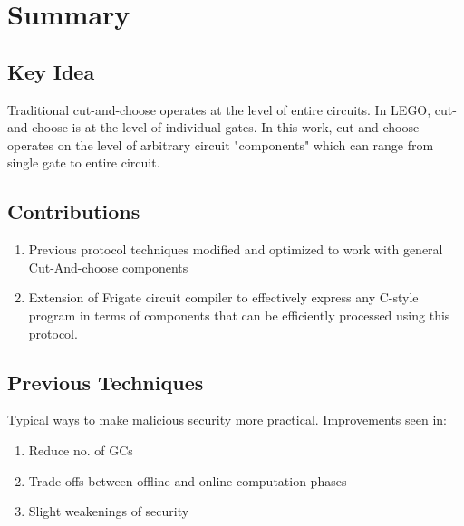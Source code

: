 
\clearpage
{}

%
\setcounter{section}{0} %

\section{Summary}

\subsection{Key Idea}
Traditional cut-and-choose operates at the level of entire circuits. In LEGO, cut-and-choose is at the level of individual gates. In this work, cut-and-choose operates on the level of arbitrary circuit "components" which can range from single gate to entire circuit.

\subsection{Contributions}
\begin{enumerate}
    \item Previous protocol techniques modified and optimized to work with general Cut-And-choose components 
    \item Extension of Frigate circuit compiler to effectively express any C-style program in terms of components that can be efficiently processed using this protocol. 
\end{enumerate}

\subsection{Previous Techniques}
Typical ways to make malicious security more practical. Improvements seen in:
\begin{enumerate}
    \item Reduce no. of GCs 
    \item Trade-offs between offline and online computation phases
    \item Slight weakenings of security
\end{enumerate}

